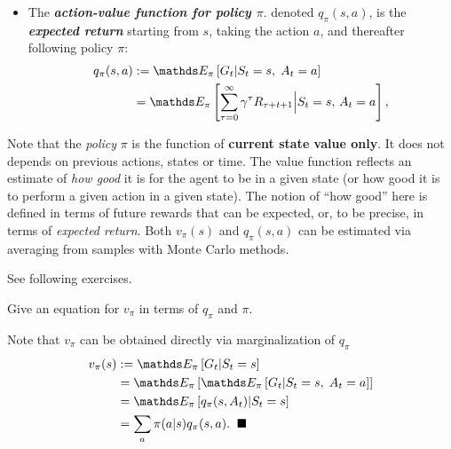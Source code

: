 \documentclass[11pt]{article}
\begin{document}
\begin{itemize}
\item The \emph{\textbf{action-value function for policy $\pi$}}. denoted $q_{\pi}(s,a)$, is the \emph{\textbf{expected return}} starting from $s$, taking the action $a$, and thereafter following policy $\pi$:
\begin{align}
q_{\pi}(s, a) &:= \E{\pi}{G_{t} | S_{t} = s, \;A_{t}=a}  \label{eqn: value_action_state_fun}\\
&=\E{\pi}{\sum_{\tau=0}^{\infty}\gamma^{\tau}R_{\tau+t+1} \Big| S_{t} = s, \, A_{t} = a} , \nonumber
\end{align}
\end{itemize}
Note that the \emph{policy} $\pi$ is the  function of \textbf{current state value only}. It does not depends on previous actions, states or time.  The value function reflects an estimate of \emph{how good} it is for the agent to be in a given state (or how good it is to perform a given action in a given state). The notion of “how good” here is defined in terms of future rewards that can be expected, or, to be precise, in terms of \emph{expected return}.  Both $v_{\pi}(s)$ and $q_{\pi}(s,a)$ can be estimated via averaging from samples with Monte Carlo methods. 

See following exercises.  
\begin{exercise} Give an equation for $v_{\pi}$ in terms of $q_{\pi}$ and $\pi$.
\end{exercise}
\begin{solution} Note that $v_{\pi}$ can be obtained directly via marginalization of $q_{\pi}$
\begin{align}
v_{\pi}(s) &:= \E{\pi}{G_{t} | S_{t} = s} \nonumber\\
&= \E{\pi}{\E{\pi}{G_{t} | S_{t} = s, \;A_{t}=a}} \nonumber\\
&=\E{\pi}{q_{\pi}(s, A_{t}) | S_{t}=s}\label{eqn: value_fun_by_value_action2}\\
&= \sum_{a}\pi(a|s)q_{\pi}(s, a).\;\;\QEDA   \label{eqn: value_fun_by_value_action}
\end{align} 
\end{solution}
\end{document}
